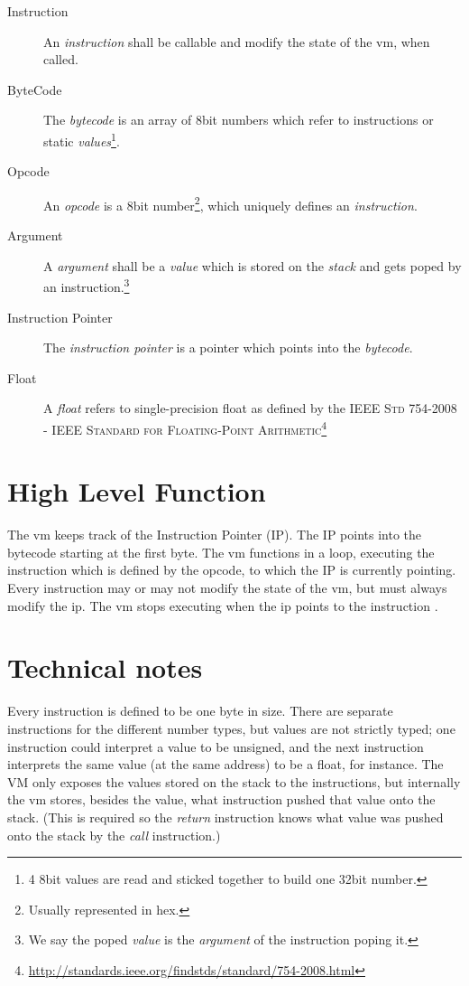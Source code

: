 \documentclass[10pt,a4paper]{article}
\begin{document}
\begin{description}
		\item[Instruction] An \textit{instruction} shall be callable and modify the state of the vm, when called.
			
		\item[ByteCode] The \textit{bytecode} is an array of 8bit numbers which refer to instructions or static \textit{values}\footnote{4 8bit values are read and sticked together to build one 32bit number.}.	
		
		\item[Opcode] An \textit{opcode} is a 8bit number\footnote{Usually represented in hex.}, which uniquely defines an \textit{instruction}.
		
 		\item[Argument]A \textit{argument} shall be a \textit{value} which is stored on the \textit{stack} and gets poped by an instruction.\footnote{We say the poped \textit{value} is the \textit{argument} of the instruction poping it.}
 		
		\item[Instruction Pointer] The \textit{instruction pointer} is a pointer which points into the \textit{bytecode}. 	
		
		\item[Float] A \textit{float} refers to single-precision float	as defined by the \textsc{IEEE Std 754-2008 - IEEE Standard for Floating-Point Arithmetic}\footnote{\url{http://standards.ieee.org/findstds/standard/754-2008.html}}
 		

	\end{description}
	\section{High Level Function}
	\label{high_level_function}	
	
	The vm keeps track of the Instruction Pointer (IP). The IP points into the bytecode starting at the first byte. The vm functions in a loop, executing the instruction which is defined by the opcode, to which the IP is currently pointing. Every instruction may or may not modify the state of the vm, but must always modify the ip. The vm stops executing when the ip points to the instruction .
	
	\section{Technical notes}
	\label{technical_notes}	
	Every instruction is defined to be one byte in size. There are separate instructions for the different number types, but values are not strictly typed; one instruction could interpret a value to be unsigned, and the next instruction interprets the same value (at the same address) to be a float, for instance. The VM only exposes the values stored on the stack to the instructions, but internally the vm stores, besides the value, what instruction pushed that value onto the stack. (This is required so the \textit{return} instruction knows what value was pushed onto the stack by the \textit{call} instruction.)
	
\end{document}
